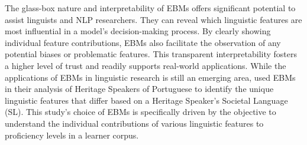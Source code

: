 The glass-box nature and interpretability of EBMs offers significant potential to assist linguists and NLP
researchers. They can reveal
which linguistic
features are
most influential in a model's decision-making process. By clearly showing individual feature contributions, EBMs
also facilitate the observation of any potential biases or problematic features. This transparent interpretability
fosters a higher level of trust and readily supports real-world applications.
While the applications of EBMs in linguistic research is still an emerging area, \citet{akef2025} used EBMs in their
analysis of
Heritage Speakers of Portuguese to identify the unique linguistic features that differ based on a Heritage Speaker's
Societal Language (SL). This study's choice of EBMs is specifically driven by the objective to understand the
individual contributions of various linguistic features to proficiency levels in a learner corpus.